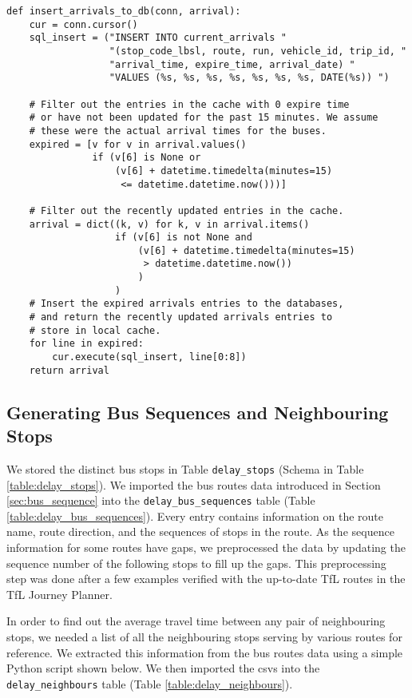 \begin{verbatim}
def insert_arrivals_to_db(conn, arrival):
    cur = conn.cursor()
    sql_insert = ("INSERT INTO current_arrivals "
                  "(stop_code_lbsl, route, run, vehicle_id, trip_id, "
                  "arrival_time, expire_time, arrival_date) "
                  "VALUES (%s, %s, %s, %s, %s, %s, %s, DATE(%s)) ")

    # Filter out the entries in the cache with 0 expire time
    # or have not been updated for the past 15 minutes. We assume
    # these were the actual arrival times for the buses.
    expired = [v for v in arrival.values()
               if (v[6] is None or
                   (v[6] + datetime.timedelta(minutes=15)
                    <= datetime.datetime.now()))]

    # Filter out the recently updated entries in the cache.
    arrival = dict((k, v) for k, v in arrival.items()
                   if (v[6] is not None and
                       (v[6] + datetime.timedelta(minutes=15)
                        > datetime.datetime.now())
                       )
                   )
    # Insert the expired arrivals entries to the databases,
    # and return the recently updated arrivals entries to
    # store in local cache.
    for line in expired:
        cur.execute(sql_insert, line[0:8])
    return arrival
\end{verbatim}


\subsection{Generating Bus Sequences and Neighbouring Stops}
\label{sec:bus_stop_locations_routes}
\par We stored the distinct bus stops in Table \texttt{delay\_stops} (Schema in Table \ref{table:delay_stops}). We imported the bus routes data introduced in Section \ref{sec:bus_sequence} into the \texttt{delay\_bus\_sequences} table (Table \ref{table:delay_bus_sequences}). Every entry contains information on the route name, route direction, and the sequences of stops in the route. As the sequence information for some routes have gaps, we preprocessed the data by updating the sequence number of the following stops to fill up the gaps. This preprocessing step was done after a few examples verified with the up-to-date TfL routes in the TfL Journey Planner.

\par In order to find out the average travel time between any pair of neighbouring stops, we needed a list of all the neighbouring stops serving by various routes for reference. We extracted this information from the bus routes data using a simple Python script shown below. We then imported the \acrshort{csv}s into the \texttt{delay\_neighbours} table (Table \ref{table:delay_neighbours}).

